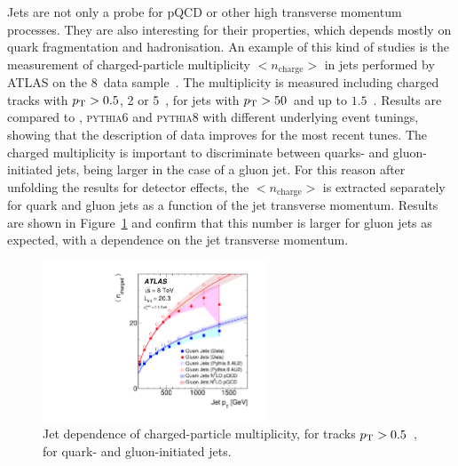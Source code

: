 \documentclass{PoS}
\providecommand{\PYTHIAS} {{\textsc{pythia6}}\xspace}
\providecommand{\PYTHIAE} {{\textsc{pythia8}}\xspace}
\begin{document}
Jets are not only a probe for pQCD or other high transverse momentum processes. They are also interesting for their
properties, which depends mostly on quark fragmentation and hadronisation. An example of this kind of studies is the
measurement of charged-particle multiplicity $<n_\mathrm{charge}>$ in jets performed by ATLAS on the 8~\TeV data sample~\cite{Aad:2016oit}.
The multiplicity is measured including charged tracks with $p_{\mathrm{T}} > 0.5$, 2 or 5~\GeV, for jets with $p_{\mathrm{T}} > 50$~\GeV and up to
$1.5$~\TeV. Results are compared to \HERWIGpp, \PYTHIAS and \PYTHIAE with different underlying event tunings, showing
that the description of data improves for the most recent tunes. 
The charged multiplicity is important to discriminate between quarks- and gluon-initiated jets, being larger in the case
of a gluon jet. For this reason after unfolding the results for detector effects, the  $<n_\mathrm{charge}>$ is
extracted separately for quark and gluon jets as a function of the jet transverse momentum. Results are shown in
Figure~\ref{fig:chargemult} and confirm that this number is larger for gluon jets as expected, with a dependence on the jet transverse
momentum.

\begin{figure}[hbtp]
  \centering
  \includegraphics[width=0.6\textwidth]{Figure9.pdf}
  \caption{Jet \pt dependence of charged-particle multiplicity, for tracks $p_{\mathrm{T}} > 0.5$~\GeV, for quark- and
    gluon-initiated jets.}
  \label{fig:chargemult}
\end{figure}
\end{document}
